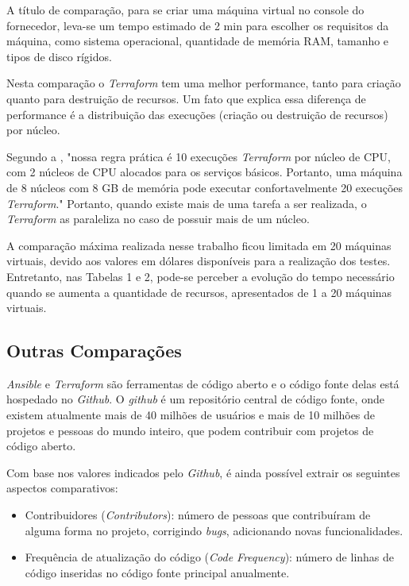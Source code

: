 A título de comparação, para se criar uma máquina virtual no console do fornecedor, leva-se um tempo estimado de 2 min para escolher os requisitos da máquina, como sistema operacional, quantidade de memória RAM, tamanho e tipos de disco rígidos. 

Nesta comparação o \textit{Terraform} tem uma melhor performance, tanto para criação quanto para destruição de recursos. Um fato que explica essa diferença de performance é a distribuição das execuções (criação ou destruição de recursos) por núcleo. 

Segundo a , "nossa regra prática é 10 execuções \textit{Terraform} por núcleo de CPU, com 2 núcleos de CPU alocados para os serviços básicos.  Portanto, uma máquina de 8 núcleos com 8 GB de memória pode executar confortavelmente 20 execuções \textit{Terraform}." Portanto, quando existe mais de uma tarefa a ser realizada, o \textit{Terraform} as paraleliza no caso de possuir mais de um núcleo.

A comparação máxima realizada nesse trabalho ficou limitada em 20 máquinas virtuais, devido aos valores em dólares disponíveis para a realização dos testes. Entretanto, nas Tabelas 1 e 2, pode-se perceber a evolução do tempo necessário quando se aumenta a quantidade de recursos, apresentados de 1 a 20 máquinas virtuais.

\subsection{Outras Comparações}
\textit{Ansible} e \textit{Terraform} são ferramentas de código aberto e o código fonte delas está hospedado no \textit{Github}. O \textit{github} é um repositório central de código fonte, onde existem atualmente mais de 40 milhões de usuários e mais de 10 milhões de projetos e pessoas do mundo inteiro, que podem contribuir com projetos de código aberto. 

Com base nos valores indicados pelo \textit{Github}, é ainda possível extrair os seguintes aspectos comparativos: 

\begin{itemize}
    \item  Contribuidores (\textit{Contributors}): número de pessoas que contribuíram de alguma forma no projeto, corrigindo \textit{bugs}, adicionando novas funcionalidades.
     \item Frequência de atualização do código (\textit{Code Frequency}): número de linhas de código inseridas no código fonte principal anualmente. 
\end{itemize}

